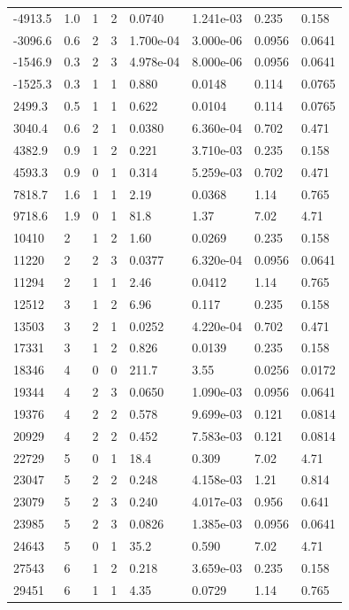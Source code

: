 \documentclass[preview]{standalone}
\begin{document}
{{\begin{tabular}{L{1.2cm}C{1.2cm} C{0.3cm}C{0.5cm} C{1.4cm}C{1.4cm} C{1.4cm}C{1.4cm}}
  -4913.5  &   1.0  & 1     &  2 &  0.0740  & 1.241e-03  & 0.235 &  0.158   \\ 
  -3096.6  &   0.6  & 2     &  3 &  1.700e-04  & 3.000e-06  & 0.0956 &  0.0641   \\ 
  -1546.9  &   0.3  & 2     &  3 &  4.978e-04  & 8.000e-06  & 0.0956 &  0.0641   \\ 
  -1525.3  &   0.3  & 1     &  1 &  0.880  & 0.0148  & 0.114 &  0.0765   \\ 
  2499.3  &   0.5  & 1     &  1 &  0.622  & 0.0104  & 0.114 &  0.0765   \\ 
  3040.4  &   0.6  & 2     &  1 &  0.0380  & 6.360e-04  & 0.702 &  0.471   \\ 
  4382.9  &   0.9  & 1     &  2 &  0.221  & 3.710e-03  & 0.235 &  0.158   \\ 
  4593.3  &   0.9  & 0     &  1 &  0.314  & 5.259e-03  & 0.702 &  0.471   \\ 
  7818.7  &   1.6  & 1     &  1 &  2.19  & 0.0368  & 1.14 &  0.765   \\ 
  9718.6  &   1.9  & 0     &  1 &  81.8  & 1.37  & 7.02 &  4.71   \\ 
  10410  &     2  & 1     &  2 &  1.60  & 0.0269  & 0.235 &  0.158   \\ 
  11220  &     2  & 2     &  3 &  0.0377  & 6.320e-04  & 0.0956 &  0.0641   \\ 
  11294  &     2  & 1     &  1 &  2.46  & 0.0412  & 1.14 &  0.765   \\ 
  12512  &     3  & 1     &  2 &  6.96  & 0.117  & 0.235 &  0.158   \\ 
  13503  &     3  & 2     &  1 &  0.0252  & 4.220e-04  & 0.702 &  0.471   \\ 
  17331  &     3  & 1     &  2 &  0.826  & 0.0139  & 0.235 &  0.158   \\ 
  18346  &     4  & 0     &  0 &  211.7  & 3.55  & 0.0256 &  0.0172   \\ 
  19344  &     4  & 2     &  3 &  0.0650  & 1.090e-03  & 0.0956 &  0.0641   \\ 
  19376  &     4  & 2     &  2 &  0.578  & 9.699e-03  & 0.121 &  0.0814   \\ 
  20929  &     4  & 2     &  2 &  0.452  & 7.583e-03  & 0.121 &  0.0814   \\ 
  22729  &     5  & 0     &  1 &  18.4  & 0.309  & 7.02 &  4.71   \\ 
  23047  &     5  & 2     &  2 &  0.248  & 4.158e-03  & 1.21 &  0.814   \\ 
  23079  &     5  & 2     &  3 &  0.240  & 4.017e-03  & 0.956 &  0.641   \\ 
  23985  &     5  & 2     &  3 &  0.0826  & 1.385e-03  & 0.0956 &  0.0641   \\ 
  24643  &     5  & 0     &  1 &  35.2  & 0.590  & 7.02 &  4.71   \\ 
  27543  &     6  & 1     &  2 &  0.218  & 3.659e-03  & 0.235 &  0.158   \\ 
  29451  &     6  & 1     &  1 &  4.35  & 0.0729  & 1.14 &  0.765   \\ 
\hline 
\end{tabular} 

}}
\end{document}
